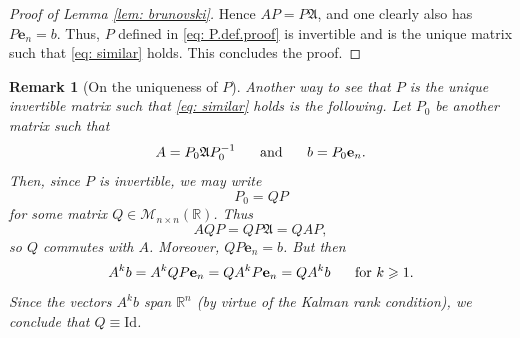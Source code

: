 \documentclass[journal,twoside,web]{ieeecolor}
\newcommand{\R}{\mathbb{R}}
\newtheorem{remark}{Remark}
\begin{document}
\begin{proof}[Proof of Lemma \ref{lem: brunovski}]
Hence $AP= P\mathfrak{A}$, and one clearly also has $P\mathbf{e}_n = b$.
Thus, $P$ defined in \eqref{eq: P.def.proof} is invertible and is the unique matrix such that \eqref{eq: similar} holds.
	This concludes the proof.
	\end{proof}
	
	\begin{remark}[On the uniqueness of $P$]
	Another way to see that $P$ is the unique invertible matrix such that \eqref{eq: similar} holds is the following. Let $P_0$ be another matrix such that
	\begin{equation}
	A=P_0\mathfrak{A}P_0^{-1} \hspace{0.5cm} \text{ and } \hspace{0.5cm} b=P_0\mathbf{e}_n.
	\end{equation}
	Then, since $P$ is invertible, we may write
	\begin{equation}
	P_0 = QP
	\end{equation}
	for some matrix $Q \in \mathcal{M}_{n\times n}(\R)$.
	Thus 
	\begin{equation}
	AQP = QP\mathfrak{A} = QAP,
	\end{equation}
	so $Q$ commutes with $A$. Moreover, $QP\mathbf{e}_n = b$.
	But then
	\begin{equation}
	A^k b = A^k QP\mathbf{e}_n = QA^k P\mathbf{e}_n = QA^k b \hspace{0.5cm} \text{ for } k\geqslant 1.
	\end{equation}
	Since the vectors $A^k b$ span $\R^n$ (by virtue of the Kalman rank condition), we conclude that $Q\equiv\mathrm{Id}$.
	\end{remark}
\end{document}
